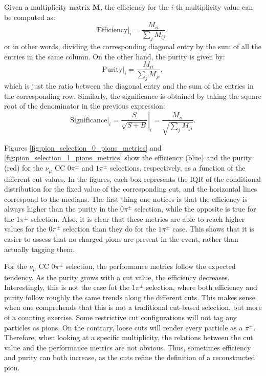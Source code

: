 Given a multiplicity matrix $\mathbf{M}$, the efficiency for the $i$-th multiplicity value can be computed as:
\begin{equation}\label{eq:efficiency_matrix}
    \left.\mathrm{Efficiency}\right|_{i} = \frac{M_{ii}}{\sum_{j} M_{ij}},
\end{equation}
or in other words, dividing the corresponding diagonal entry by the sum of all the entries in the same column. On the other hand, the purity is given by:
\begin{equation}\label{eq:purity_matrix}
    \left.\mathrm{Purity}\right|_{i} = \frac{M_{ii}}{\sum_{j} M_{ji}},
\end{equation}
which is just the ratio between the diagonal entry and the sum of the entries in the corresponding row. Similarly, the significance is obtained by taking the square root of the denominator in the previous expression:
\begin{equation}\label{eq:significance_matrix}
    \left.\mathrm{Significance}\right|_{i} = \left.\frac{S}{\sqrt{S+B}}\right|_{i} = \frac{M_{ii}}{\sqrt{\sum_{j} M_{ji}}}.
\end{equation}

Figures \ref{fig:pion_selection_0_pions_metrics} and \ref{fig:pion_selection_1_pions_metrics} show the efficiency (blue) and the purity (red) for the $\nu_{\mu}$ CC $0\pi^{\pm}$ and $1\pi^{\pm}$ selections, respectively, as a function of the different cut values. In the figures, each box represents the IQR of the conditional distribution for the fixed value of the corresponding cut, and the horizontal lines correspond to the medians. The first thing one notices is that the efficiency is always higher than the purity in the $0\pi^{\pm}$ selection, while the opposite is true for the $1\pi^{\pm}$ selection. Also, it is clear that these metrics are able to reach higher values for the $0\pi^{\pm}$ selection than they do for the $1\pi^{\pm}$ case. This shows that it is easier to assess that no charged pions are present in the event, rather than actually tagging them.

For the $\nu_{\mu}$ CC $0\pi^{\pm}$ selection, the performance metrics follow the expected tendency. As the purity grows with a cut value, the efficiency decreases. Interestingly, this is not the case fot the $1\pi^{\pm}$ selection, where both efficiency and purity follow roughly the same trends along the different cuts. This makes sense when one comprehends that this is not a traditional cut-based selection, but more of a counting exercise. Some restrictive cut configurations will not tag any particles as pions. On the contrary, loose cuts will render every particle as a $\pi^{\pm}$. Therefore, when looking at a specific multiplicity, the relations between the cut value and the performance metrics are not obvious. Thus, sometimes efficiency and purity can both increase, as the cuts refine the definition of a reconstructed pion.

